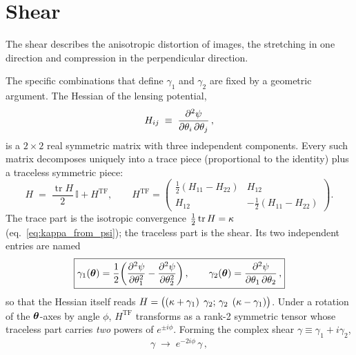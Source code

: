 \section{Shear}
\label{sec:shear}

The shear describes the anisotropic distortion of images, the
stretching in one direction and compression in the perpendicular
direction.

The specific combinations that define $\gamma_1$ and $\gamma_2$ are
fixed by a geometric argument.  The Hessian of the lensing
potential,
\begin{equation*}
    H_{ij} \;\equiv\; \frac{\partial^2 \psi}{\partial\theta_i\,\partial\theta_j} \,,
\end{equation*}
is a $2{\times}2$ real symmetric matrix with three independent
components.  Every such matrix decomposes uniquely into a trace piece
(proportional to the identity) plus a traceless symmetric piece:
\begin{equation}
    H \;=\; \frac{\operatorname{tr}H}{2}\,\mathbb{I} + H^{\mathrm{TF}},
    \qquad
    H^{\mathrm{TF}} = \begin{pmatrix}
        \tfrac{1}{2}(H_{11}-H_{22}) & H_{12} \\
        H_{12} & -\tfrac{1}{2}(H_{11}-H_{22})
    \end{pmatrix}.
    \label{eq:hessian_decomp}
\end{equation}
The trace part is the isotropic convergence
$\tfrac{1}{2}\operatorname{tr}H = \kappa$
(eq.~\ref{eq:kappa_from_psi}); the traceless part is the shear.
Its two independent entries are named
\begin{equation}
    \boxed{
    \gamma_1(\boldsymbol{\theta}) = \frac{1}{2}\!\left(
    \frac{\partial^2 \psi}{\partial\theta_1^2}
    - \frac{\partial^2 \psi}{\partial\theta_2^2}\right) ,
    \qquad
    \gamma_2(\boldsymbol{\theta})
    = \frac{\partial^2 \psi}{\partial\theta_1\,\partial\theta_2} \,,}
    \label{eq:shear_components}
\end{equation}
so that the Hessian itself reads
$H = \bigl((\kappa + \gamma_1)\;\,\gamma_2;\,\gamma_2\;\,(\kappa -
\gamma_1)\bigr)$.  Under a rotation of the $\boldsymbol{\theta}$-axes by angle
$\phi$, $H^{\mathrm{TF}}$ transforms as a rank-2 symmetric tensor
whose traceless part carries \emph{two} powers of $e^{\pm i\phi}$.
Forming the complex shear $\gamma \equiv \gamma_1 + i\gamma_2$,
\begin{equation}
    \gamma \;\longrightarrow\; e^{-2i\phi}\,\gamma \,,
    \label{eq:shear_spin2}
\end{equation}
